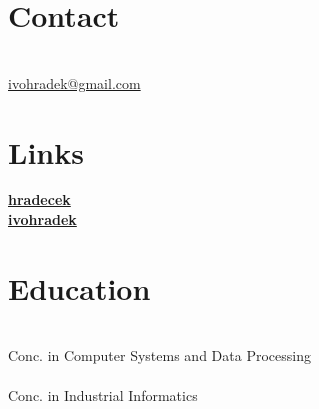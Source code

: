 \documentclass[a4paper]{deedy-resume}
\def\phone{{\FA \faPhone}}
\def\envelope{{\FA \faEnvelopeAlt}}
\def\github{{\FAB \faGithub}}
\def\linkedIn{{\FAB \faLinkedin}}
\begin{document}
\begin{minipage}[t]{0.32\textwidth} %
\section{Contact} %
\phone\hspace{8pt}\telnumber \\
\envelope\hspace{8pt}\href{mailto:ivohradek@gmail.com}{ivohradek@gmail.com}
\section{Links}
\github\hspace{8pt}\href{https://github.com/hradecek}{\bf hradecek} \\
\linkedIn\hspace{9pt}\href{https://www.linkedin.com/in/ivo-hr\%C3\%A1dek-01baa8115/}{\bf ivohradek}
\section{Education}
\\
Conc. in Computer Systems and Data Processing\\
\sectionspace
\\
Conc. in Industrial Informatics\\
\sectionspace

\end{minipage}
\end{document}
